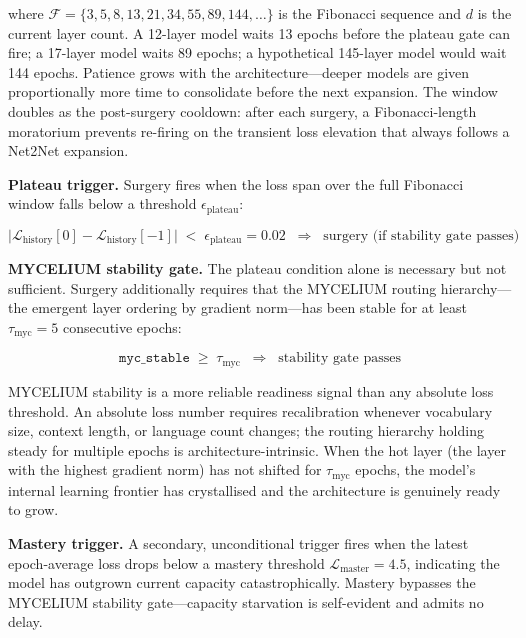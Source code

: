 \documentclass[journal,10pt,twocolumn]{IEEEtran}
\begin{document}
\noindent where $\mathcal{F} = \{3, 5, 8, 13, 21, 34, 55, 89, 144, \ldots\}$
is the Fibonacci sequence and $d$ is the current layer count.
A 12-layer model waits 13 epochs before the plateau gate can fire;
a 17-layer model waits 89 epochs; a hypothetical 145-layer model would wait
144 epochs. Patience grows with the architecture---deeper models are given
proportionally more time to consolidate before the next expansion.
The window doubles as the post-surgery cooldown: after each surgery,
a Fibonacci-length moratorium prevents re-firing on the transient loss
elevation that always follows a Net2Net expansion.

\textbf{Plateau trigger.} Surgery fires when the loss span over the full
Fibonacci window falls below a threshold $\epsilon_\text{plateau}$:

\begin{equation}
  \bigl|\mathcal{L}_\text{history}[0] - \mathcal{L}_\text{history}[-1]\bigr|
  \;<\; \epsilon_\text{plateau} = 0.02
  \;\;\Rightarrow\;\; \text{surgery (if stability gate passes)}
  \label{eq:plateau}
\end{equation}

\textbf{MYCELIUM stability gate.} The plateau condition alone is necessary
but not sufficient. Surgery additionally requires that the MYCELIUM
routing hierarchy---the emergent layer ordering by gradient norm---has
been stable for at least $\tau_\text{myc} = 5$ consecutive epochs:

\begin{equation}
  \texttt{myc\_stable} \;\geq\; \tau_\text{myc}
  \;\;\Rightarrow\;\; \text{stability gate passes}
  \label{eq:mycelium}
\end{equation}

\noindent MYCELIUM stability is a more reliable readiness signal than any
absolute loss threshold. An absolute loss number requires recalibration
whenever vocabulary size, context length, or language count changes;
the routing hierarchy holding steady for multiple epochs is
architecture-intrinsic. When the hot layer (the layer with the highest
gradient norm) has not shifted for $\tau_\text{myc}$ epochs, the model's
internal learning frontier has crystallised and the architecture is
genuinely ready to grow.

\textbf{Mastery trigger.} A secondary, unconditional trigger fires when
the latest epoch-average loss drops below a mastery threshold
$\mathcal{L}_\text{master} = 4.5$, indicating the model has outgrown
current capacity catastrophically. Mastery bypasses the MYCELIUM stability
gate---capacity starvation is self-evident and admits no delay.
\end{document}
